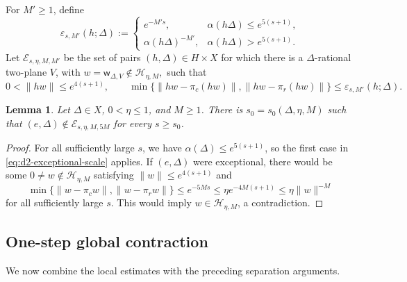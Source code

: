 \documentclass[reqno,11pt]{amsart}
\newtheorem{lem}[lem]{Lemma}
\theoremstyle{definition}
\theoremstyle{remark}
\numberwithin{equation}{section}
\begin{document}
For $M'\ge1$, define
\begin{equation}\label{eq:d2-exceptional-scale}
\varepsilon_{s,M'}(h;\Delta)
:=
\begin{cases}
e^{-M's},
&
\alpha(h\Delta)\le e^{5(s+1)},\\
\alpha(h\Delta)^{-M'},
&
\alpha(h\Delta)>e^{5(s+1)}.
\end{cases}
\end{equation}
Let $\mathcal E_{s,\eta,M,M'}$ be the set of pairs
$(h,\Delta)\in H\times X$ for which there is a $\Delta$-rational two-plane
$V$, with
$
w=\mathsf w_{\Delta,V}\notin\mathcal H_{\eta,M},
$
such that
$$
0<\|hw\|\le e^{4(s+1)},
\qquad
\min\{\|hw-\pi_c(hw)\|,\|hw-\pi_r(hw)\|\}
\le
\varepsilon_{s,M'}(h;\Delta).
$$

\begin{lem}\label{lem:d2-quasinull-at-identity}
Let $\Delta\in X$, $0<\eta\le1$, and $M\ge1$. There is
$s_0=s_0(\Delta,\eta,M)$ such that
$(e,\Delta)\notin\mathcal E_{s,\eta,M,5M}$ for every $s\ge s_0$.
\end{lem}

\begin{proof}
For all sufficiently large $s$, we have
$\alpha(\Delta)\le e^{5(s+1)}$, so the first case in
\eqref{eq:d2-exceptional-scale} applies. If $(e,\Delta)$ were exceptional,
there would be some
$0\ne w\notin\mathcal H_{\eta,M}$ satisfying $\|w\|\le e^{4(s+1)}$ and
$$
\min\{\|w-\pi_cw\|,\|w-\pi_rw\|\}
\le
e^{-5Ms}
\le
\eta e^{-4M(s+1)}
\le
\eta\|w\|^{-M}
$$
for all sufficiently large $s$. This would imply
$w\in\mathcal H_{\eta,M}$, a contradiction.
\end{proof}

\subsection{One-step global contraction}

We now combine the local estimates with the preceding separation
arguments.
\end{document}

